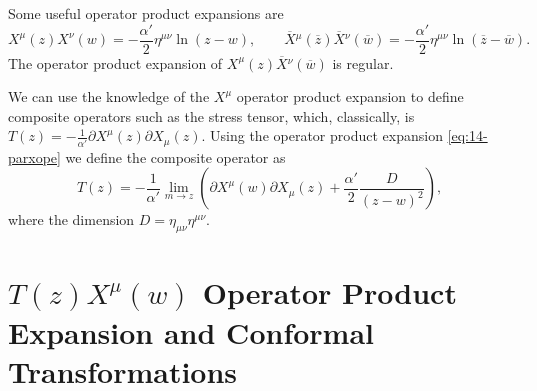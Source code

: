 Some useful operator product expansions are
\begin{equation}
  X^{\mu}(z) X^{\nu}(w) = -\frac{\alpha'}{2} \eta^{\mu\nu} \ln (z-w), \qquad
  \overline X{}^{\mu}(\overline{z}{}) \overline{X}{}^{\nu}(\overline{w}{}) = -\frac{\alpha'}{2} \eta^{\mu\nu} \ln (\overline{z}{}-\overline{w}{}).
\end{equation}
The operator product expansion of $X^{\mu}(z) \overline{X}{}^{\nu}(\overline{w}{})$ is regular.

We can use the knowledge of the $X^{\mu}$ operator product expansion to define composite operators such as the stress tensor, which, classically, is $ T(z) = -\frac{1}{\alpha'} \partial X^{\mu}(z) \partial X_{\mu}(z) $.
Using the operator product expansion \eqref{eq:14-parxope} we define the composite operator as
\begin{equation}
  T(z) = -\frac{1}{\alpha'} \lim_{m \to z} \left( \partial X^{\mu}(w) \partial X_{\mu}(z) + \frac{\alpha'}{2} \frac{D}{(z - w)^2} \right),
\end{equation}
where the dimension $D = \eta_{\mu\nu} \eta^{\mu\nu}$.


\section{\texorpdfstring{$T(z) X^{\mu}(w)$}{Stress tensor position} Operator Product Expansion and Conformal Transformations}%
\label{sec:t_x_ope_cft}

